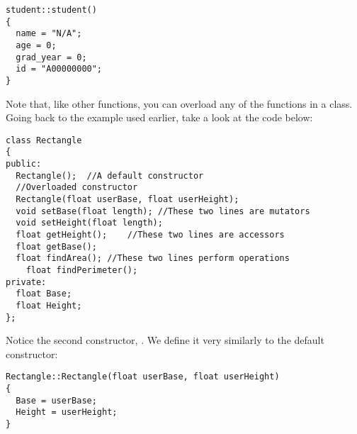 \noindent\begin{minipage}{\linewidth}\begin{lstlisting}
student::student()
{
  name = "N/A";
  age = 0;
  grad_year = 0;
  id = "A00000000";
}
\end{lstlisting}\end{minipage}


Note that, like other functions, you can overload any of the functions in a class. 
Going back to the  example used earlier, take a look at the code below:

\noindent\begin{minipage}{\linewidth}\begin{lstlisting}
class Rectangle
{
public: 
  Rectangle();	//A default constructor
  //Overloaded constructor
  Rectangle(float userBase, float userHeight);	
  void setBase(float length); //These two lines are mutators
  void setHeight(float length);
  float getHeight();	//These two lines are accessors
  float getBase();	
  float findArea();	//These two lines perform operations
	float findPerimeter();
private:
  float Base;
  float Height;
};
\end{lstlisting}\end{minipage}

Notice the second constructor, . 
We define it very similarly to the default constructor:

\noindent\begin{minipage}{\linewidth}\begin{lstlisting}
Rectangle::Rectangle(float userBase, float userHeight)
{
  Base = userBase;
  Height = userHeight;
}
\end{lstlisting}\end{minipage}


